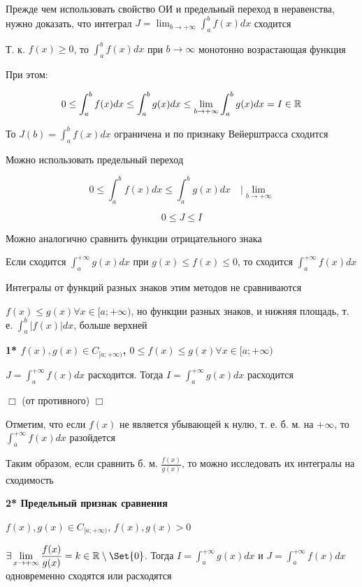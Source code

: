 \documentclass[12pt]{article}
\begin{document}
    Прежде чем использовать свойство ОИ и предельный переход в неравенства,
    нужно доказать, что интеграл $\displaystyle J = \lim_{b \to +\infty} \int^{b}_{a} f(x) dx$ сходится

    Т. к. $f(x) \geq 0$, то $\displaystyle \int^{b}_{a}f(x)dx$ при $b \to \infty$ монотонно возрастающая функция

    При этом:

    \[0 \leq \int^{b}_{a}f(x)dx \leq \int^{b}_{a}g(x)dx \leq \lim_{b \to +\infty} \int^{b}_{a}g(x)dx = I \in \mathbb{R}\]

    То $\displaystyle J(b) = \int^b_a f(x)dx$ ограничена и по признаку Вейерштрасса сходится

    Можно использовать предельный переход

    \[0 \leq \int^{b}_{a}f(x)dx \leq \int^{b}_{a}g(x)dx \quad \Big| \lim_{b \to +\infty}\]

    \[0 \leq J \leq I\]

    \Nota Можно аналогично сравнить функции отрицательного знака

    Если сходится $\displaystyle \int^{+\infty}_{a} g(x) dx$ при $g(x) \leq f(x) \leq 0$, то сходится $\displaystyle \int^{+\infty}_{a} f(x) dx$

    Интегралы от функций разных знаков этим методов не сравниваются

    $f(x) \leq g(x) \forall x \in [a;+\infty)$, но функции разных знаков, и нижняя площадь, т. е. $\displaystyle \int^{b}_{a} |f(x)| dx$, больше верхней

    \textbf{1* $f(x), g(x) \in C_{[a;+\infty)}$, $0 \leq f(x) \leq g(x) \forall x \in [a;+\infty)$}

    $\displaystyle J = \int^{+\infty}_{a} f(x) dx \text{  расходится. Тогда  } I = \int^{+\infty}_{a} g(x) dx \text{  расходится}$

    $\Box$ \Lab (от противного) $\Box$

    \Nota Отметим, что если $f(x)$ не является убывающей к нулю, т. е. б. м. на $+\infty$, то $\displaystyle \int^{+\infty}_{a} f(x) dx$ разойдется

    Таким образом, если сравнить б. м. $\displaystyle \frac{f(x)}{g(x)}$, то можно исследовать их интегралы на сходимость

    \hypertarget{improperintegralconvergenceinlimits}{}
    \textbf{2* Предельный признак сравнения}

    $f(x), g(x) \in C_{[a;+\infty)}$, $f(x), g(x) > 0$

    $\displaystyle \exists \lim_{x\to+\infty} \frac{f(x)}{g(x)} = k \in \Real \setminus \Set{0}$.
    Тогда $\displaystyle I = \int^{+\infty}_{a} g(x)dx$ и $\displaystyle J = \int^{+\infty}_{a} f(x)dx$ одновременно сходятся или расходятся
\end{document}
